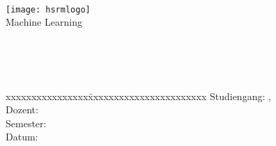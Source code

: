 \begin{center}

	\vspace{2.2cm}
	{\large \textbf{\university}}\\
	\vspace{2cm}
	
	\texttt{[image: hsrmlogo]}\\
	\vspace{2.8cm}	
	{\small Machine Learning}\\ 
	\vspace{1cm}
	\doublespacing
	{\Huge \textbf{\reporttitle}}\\ 
	\singlespacing 
	\vspace{1cm}
	{\large \reportsubtitle}\\ 
	\vspace{2.2cm}
	\onehalfspacing
	  
	  {\textbf{\students}}\\
	  
	\begin{tabbing}
		xxxxxxxxxxxxxxxx\=xxxxxxxxxxxxxxxxxxxxxxx\kill
		Studiengang: \> \studiengang, \degree\\
		Dozent: \> \prof \\
		{Semester}: \> \reportsemester  \\
		{Datum:} \> \handoverdate \\
	\end{tabbing}
	\singlespacing 

\end{center}  
